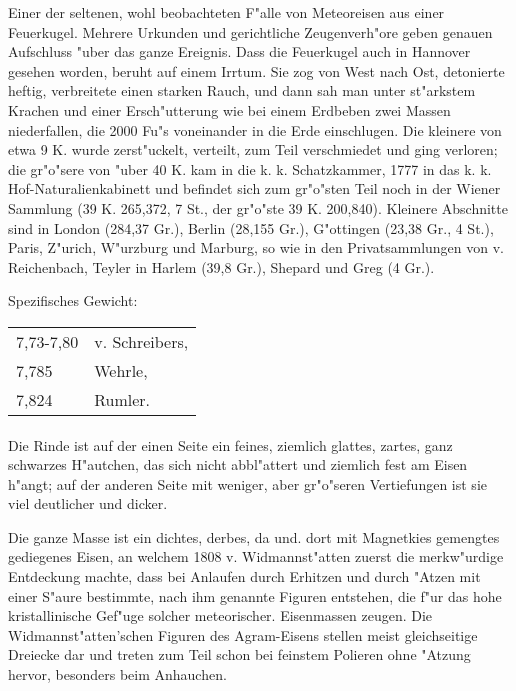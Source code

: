 \documentclass[a4paper, 11pt, oneside]{article}
\begin{document}
Einer der seltenen, wohl beobachteten F"alle von Meteoreisen aus einer Feuerkugel. Mehrere Urkunden und gerichtliche Zeugenverh"ore geben genauen Aufschluss "uber das ganze Ereignis. Dass die Feuerkugel auch in Hannover gesehen worden, beruht auf einem Irrtum. Sie zog von West nach Ost, detonierte heftig, verbreitete einen starken Rauch, und dann sah man unter st"arkstem Krachen und einer Ersch"utterung wie bei einem Erdbeben zwei Massen niederfallen, die 2000 Fu"s voneinander in die Erde einschlugen. Die kleinere von etwa 9 K. wurde zerst"uckelt, verteilt, zum Teil verschmiedet und ging verloren; die gr"o"sere von "uber 40 K. kam in die k. k. Schatzkammer, 1777 in das k. k. Hof-Naturalienkabinett und befindet sich zum gr"o"sten Teil noch in der Wiener Sammlung (39 K. 265,372, 7 St., der gr"o"ste 39 K. 200,840). Kleinere Abschnitte sind in London (284,37 Gr.), Berlin (28,155 Gr.), G"ottingen (23,38 Gr., 4 St.), Paris, Z"urich, W"urzburg und Marburg, so wie in den Privatsammlungen von v. Reichenbach, Teyler in Harlem (39,8 Gr.), Shepard und Greg (4 Gr.).

Spezifisches Gewicht:  
\begin{table}[!ht]
    \centering
    \begin{tabular}{l l}
        7,73-7,80 & v. Schreibers,\\
        7,785 & Wehrle,\\
        7,824 & Rumler.
    \end{tabular}
\end{table}
\paragraph{}
Die Rinde ist auf der einen Seite ein feines, ziemlich glattes, zartes, ganz schwarzes H"autchen, das sich nicht abbl"attert und ziemlich fest am Eisen h"angt; auf der anderen Seite mit weniger, aber gr"o"seren Vertiefungen ist sie viel deutlicher und dicker.

Die ganze Masse ist ein dichtes, derbes, da und. dort mit Magnetkies gemengtes gediegenes Eisen, an welchem 1808 v. Widmannst"atten zuerst die merkw"urdige Entdeckung machte, dass bei Anlaufen durch Erhitzen und durch "Atzen mit einer S"aure bestimmte, nach ihm genannte Figuren entstehen, die f"ur das hohe kristallinische Gef"uge solcher meteorischer. Eisenmassen zeugen. Die Widmannst"atten'schen Figuren des Agram-Eisens stellen meist gleichseitige Dreiecke dar und treten zum Teil schon bei feinstem Polieren ohne "Atzung hervor, besonders beim Anhauchen.
\end{document}
